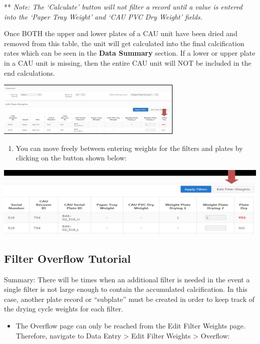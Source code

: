 \documentclass[]{book}
\providecommand{\tightlist}{%
  \setlength{\itemsep}{0pt}\setlength{\parskip}{0pt}}
\begin{document}
** \emph{Note: The `Calculate' button will not filter a record until a value is entered into the `Paper Tray Weight' and `CAU PVC Dry Weight' fields.}

Once BOTH the upper and lower plates of a CAU unit have been dried and removed from this table, the unit will get calculated into the final calcification rates which can be seen in the \textbf{Data Summary} section. If a lower or upper plate in a CAU unit is missing, then the entire CAU unit will NOT be included in the end calculations.

\includegraphics{images/Data14.jpg}

\begin{enumerate}
\def\labelenumi{\arabic{enumi}.}
\setcounter{enumi}{7}
\tightlist
\item
  You can move freely between entering weights for the filters and plates by clicking on the button shown below:
\end{enumerate}

\includegraphics{images/Data15.jpg}

\hypertarget{filter-overflow-tutorial}{%
\subsection{Filter Overflow Tutorial}\label{filter-overflow-tutorial}}

Summary: There will be times when an additional filter is needed in the event a single filter is not large enough to contain the accumulated calcification. In this case, another plate record or ``subplate'' must be created in order to keep track of the drying cycle weights for each filter.

\begin{itemize}
\tightlist
\item
  The Overflow page can only be reached from the Edit Filter Weights page. Therefore, navigate to Data Entry \textgreater{} Edit Filter Weights \textgreater{} Overflow:
\end{itemize}
\end{document}
